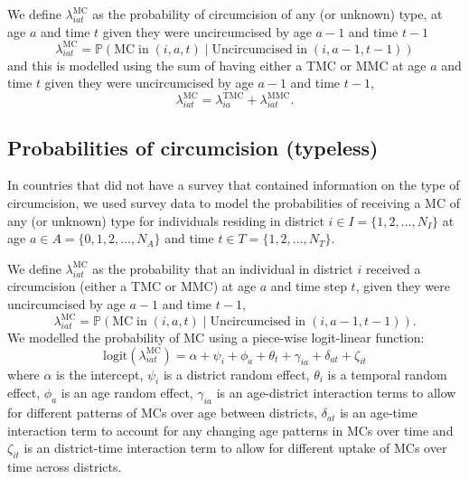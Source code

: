 \documentclass{article}
\begin{document}
\begin{appendix}

\noindent We define $\lambda^{\text{MC}}_{iat}$ as the probability of circumcision of any (or unknown) type, at age $a$ and time $t$ given they were uncircumcised by age $a-1$ and time $t-1$ 
\begin{equation*}
	\lambda^{\text{MC}}_{iat} = \mathbb{P}(\text{MC} \; \text{in} \; (i,a,t) \; | \; \text{Uncircumcised in} \; (i,a-1,t-1))
\end{equation*}
and this is modelled using the sum of having either a TMC or MMC at age $a$ and time $t$ given they were uncircumcised by age $a-1$ and time $t-1$,
\begin{equation*}
	\lambda^{\text{MC}}_{iat} = \lambda^{\text{TMC}}_{ia} + \lambda^{\text{MMC}}_{iat}. 
\end{equation*}


\subsection{Probabilities of circumcision (typeless)}
\label{sec::typeless}


In countries that did not have a survey that contained information on the type of circumcision, we used survey data to model the probabilities of receiving a MC of any (or unknown) type for individuals residing in district $i \in I = \{1, 2, \ldots, N_I\}$ at age $a \in A = \{0, 1, 2, \ldots, N_A\}$ and time $t \in T = \{1, 2, \ldots, N_T\}$. 

\noindent We define $\lambda^{\text{MC}}_{iat}$ as the probability that an individual in district $i$ received a circumcision (either a TMC or MMC) at age $a$ and time step $t$, given they were uncircumcised by age $a-1$ and time $t-1$, 
\begin{equation*} 
		\lambda^{\text{MC}}_{iat} = \mathbb{P}(\text{MC} \; \text{in} \; (i,a,t) \; | \; \text{Uncircumcised in} \; (i,a-1, t-1)). 
	\label{eqn::MC}
\end{equation*}
We modelled the probability of MC using a piece-wise logit-linear function:
\begin{equation*}
	\text{logit}(\lambda^{\text{MC}}_{iat}) = \alpha + \psi_i + \phi_a + \theta_t + \gamma_{ia} + \delta_{at} + \zeta_{it} 
\end{equation*}
where $\alpha$ is the intercept, $\psi_i$ is a district random effect, $\theta_i$ is a temporal random effect, $\phi_a$ is an age random effect, $\gamma_{ia}$ is an age-district interaction terms to allow for different patterns of MCs over age between districts, $\delta_{at}$ is an age-time interaction term to account for any changing age patterns in MCs over time and $\zeta_{it}$ is an district-time interaction term to allow for different uptake of MCs over time across districts. 


\end{appendix}
\end{document}
